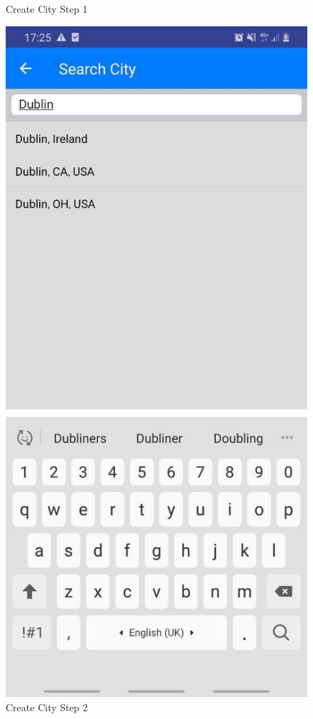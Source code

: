 \begin{figure}[h!]
\begin{minipage}[t]{0.48\textwidth}
\caption{Create City Step 1}
\label{fig:Create City}
\end{minipage}
\hspace*{\fill} %
\begin{minipage}[t]{0.48\textwidth}
\includegraphics[width=\linewidth,keepaspectratio=true]{img/search.jpg}
\caption{Create City Step 2}
\label{fig:Create City2}
\end{minipage}
\end{figure}

